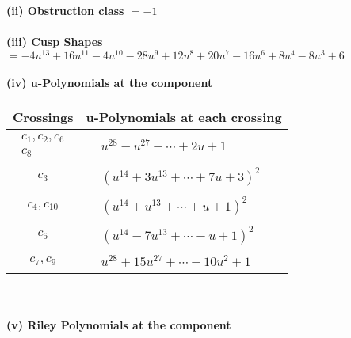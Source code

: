 \documentclass[1p]{elsarticle_modified}
\theoremstyle{definition}
\begin{document}
\flushleft \textbf{(ii) Obstruction class $= -1$}\\~\\
\flushleft \textbf{(iii) Cusp Shapes $= -4 u^{13}+16 u^{11}-4 u^{10}-28 u^9+12 u^8+20 u^7-16 u^6+8 u^4-8 u^3+6$}\\~\\
\newpage\renewcommand{\arraystretch}{1}
\flushleft \textbf{(iv) u-Polynomials at the component}\newline \\
\begin{tabular}{m{50pt}|m{274pt}}
Crossings & \hspace{64pt}u-Polynomials at each crossing \\
\hline $$\begin{aligned}c_{1},c_{2},c_{6}\\c_{8}\end{aligned}$$&$\begin{aligned}
&u^{28}- u^{27}+\cdots+2 u+1
\end{aligned}$\\
\hline $$\begin{aligned}c_{3}\end{aligned}$$&$\begin{aligned}
&(u^{14}+3 u^{13}+\cdots+7 u+3)^{2}
\end{aligned}$\\
\hline $$\begin{aligned}c_{4},c_{10}\end{aligned}$$&$\begin{aligned}
&(u^{14}+u^{13}+\cdots+u+1)^{2}
\end{aligned}$\\
\hline $$\begin{aligned}c_{5}\end{aligned}$$&$\begin{aligned}
&(u^{14}-7 u^{13}+\cdots- u+1)^{2}
\end{aligned}$\\
\hline $$\begin{aligned}c_{7},c_{9}\end{aligned}$$&$\begin{aligned}
&u^{28}+15 u^{27}+\cdots+10 u^2+1
\end{aligned}$\\
\hline
\end{tabular}\\~\\
\newpage\renewcommand{\arraystretch}{1}
\flushleft \textbf{(v) Riley Polynomials at the component}\newline \\
\end{document}
